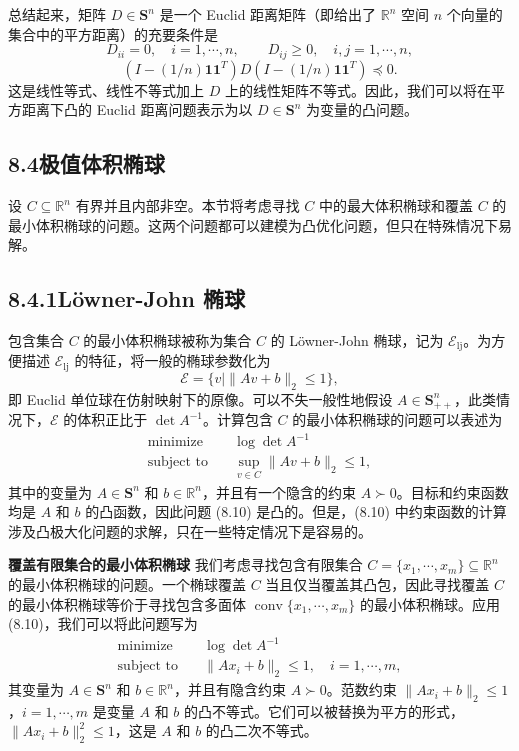 \documentclass[UTF8,12pt,a4paper,fontset=fandol]{ctexart}
\begin{document}
总结起来，矩阵 $D\in\mathbf{S}^n$ 是一个 Euclid 距离矩阵（即给出了 $\mathbb{R}^n$ 空间 $n$ 个向量的集合中的平方距离）的充要条件是
\[
D_{ii}=0,\quad i=1,\cdots,n,\qquad D_{ij}\geq 0,\quad i,j=1,\cdots,n,
\]
\[
(I-(1/n)\mathbf{1}\mathbf{1}^T)D(I-(1/n)\mathbf{1}\mathbf{1}^T)\preceq 0.
\]
这是线性等式、线性不等式加上 $D$ 上的线性矩阵不等式。因此，我们可以将在平方距离下凸的 Euclid 距离问题表示为以 $D\in\mathbf{S}^n$ 为变量的凸问题。

\subsection*{8.4\quad 极值体积椭球}

设 $C\subseteq\mathbb{R}^n$ 有界并且内部非空。本节将考虑寻找 $C$ 中的最大体积椭球和覆盖 $C$ 的最小体积椭球的问题。这两个问题都可以建模为凸优化问题，但只在特殊情况下易解。

\subsection*{8.4.1\quad Löwner-John 椭球}

包含集合 $C$ 的最小体积椭球被称为集合 $C$ 的 Löwner-John 椭球，记为 $\mathcal{E}_{\mathrm{lj}}$。为方便描述 $\mathcal{E}_{\mathrm{lj}}$ 的特征，将一般的椭球参数化为
\begin{equation}
\mathcal{E}=\{v\mid \|Av+b\|_2\leq 1\},
\tag{8.9}
\end{equation}
即 Euclid 单位球在仿射映射下的原像。可以不失一般性地假设 $A\in\mathbf{S}_{++}^n$，此类情况下，$\mathcal{E}$ 的体积正比于 $\det A^{-1}$。计算包含 $C$ 的最小体积椭球的问题可以表述为
\begin{equation}
\begin{aligned}
\text{minimize}\quad & \log\det A^{-1}\\
\text{subject to}\quad & \sup_{v\in C}\|Av+b\|_2\leq 1,
\end{aligned}
\tag{8.10}
\end{equation}
其中的变量为 $A\in\mathbf{S}^n$ 和 $b\in\mathbb{R}^n$，并且有一个隐含的约束 $A\succ 0$。目标和约束函数均是 $A$ 和 $b$ 的凸函数，因此问题 (8.10) 是凸的。但是，(8.10) 中约束函数的计算涉及凸极大化问题的求解，只在一些特定情况下是容易的。

\noindent\textbf{覆盖有限集合的最小体积椭球}\quad
我们考虑寻找包含有限集合 $C=\{x_1,\cdots,x_m\}\subseteq\mathbb{R}^n$ 的最小体积椭球的问题。一个椭球覆盖 $C$ 当且仅当覆盖其凸包，因此寻找覆盖 $C$ 的最小体积椭球等价于寻找包含多面体 $\operatorname{conv}\{x_1,\cdots,x_m\}$ 的最小体积椭球。应用 (8.10)，我们可以将此问题写为
\begin{equation}
\begin{aligned}
\text{minimize}\quad & \log\det A^{-1}\\
\text{subject to}\quad & \|Ax_i+b\|_2\leq 1,\quad i=1,\cdots,m,
\end{aligned}
\tag{8.11}
\end{equation}
其变量为 $A\in\mathbf{S}^n$ 和 $b\in\mathbb{R}^n$，并且有隐含约束 $A\succ 0$。范数约束 $\|Ax_i+b\|_2\leq 1$，$i=1,\cdots,m$ 是变量 $A$ 和 $b$ 的凸不等式。它们可以被替换为平方的形式，$\|Ax_i+b\|_2^2\leq 1$，这是 $A$ 和 $b$ 的凸二次不等式。
\end{document}
